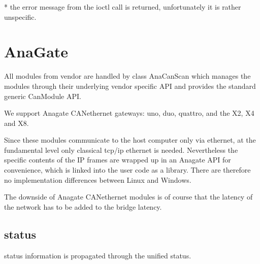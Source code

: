 \documentclass[a4paper,10pt,english]{sphinxmanual}
\begin{document}
* the error message from the ioctl call is returned, unfortunately it is rather unspecific.


\chapter{AnaGate}
\label{\detokenize{vendors/anagate:anagate}}\label{\detokenize{vendors/anagate::doc}}
All modules from vendor {\hyperref[\detokenize{vendors/anagate:anagate}]{}} are handled by class AnaCanScan which manages the modules through their underlying vendor specific API and provides
the standard generic CanModule API.

We support Anagate CAN\sphinxhyphen{}ethernet gateways: uno, duo, quattro, and the X2, X4 and X8.

Since these modules communicate to the host computer only via ethernet, at the fundamental level only classical
tcp/ip ethernet is needed. Nevertheless the specific contents of the IP frames are wrapped up in an Anagate API for convenience, which is linked
into the user code as a library. There are therefore no implementation differences between Linux and Windows.

The downside of Anagate CAN\sphinxhyphen{}ethernet modules is of course that the latency of the network has to be added to the bridge latency.


\section{status}
\label{\detokenize{vendors/anagate:status}}
status information is propagated through the unified status.
\end{document}
